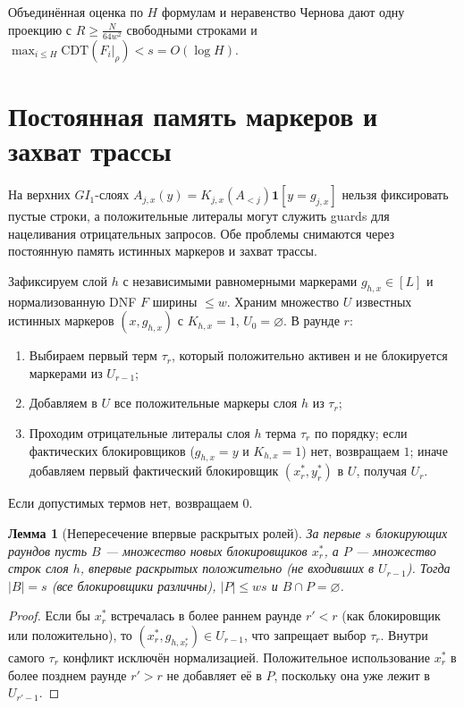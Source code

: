 \documentclass[11pt,a4paper]{article}
\newtheorem{lemma}[theorem]{Лемма}
\theoremstyle{definition}
\theoremstyle{remark}
\newcommand{\CDT}{\mathrm{CDT}}
\newcommand{\GI}{GI_1}
\begin{document}
Объединённая оценка по $H$ формулам и неравенство Чернова дают одну проекцию с $R \ge \frac{N}{64w^2}$ свободными строками и $\max_{i \le H} \CDT(F_i|_\rho) < s = O(\log H)$.

\section{Постоянная память маркеров и захват трассы}

На верхних $\GI$-слоях $A_{j,x}(y) = K_{j,x}(A_{<j})\mathbf{1}[y = g_{j,x}]$ нельзя фиксировать пустые строки, а положительные литералы могут служить guards для нацеливания отрицательных запросов. Обе проблемы снимаются через постоянную память истинных маркеров и захват трассы.

Зафиксируем слой $h$ с независимыми равномерными маркерами $g_{h,x} \in [L]$ и нормализованную DNF $F$ ширины $\le w$. Храним множество $U$ известных истинных маркеров $(x, g_{h,x})$ с $K_{h,x} = 1$, $U_0 = \varnothing$. В раунде $r$:
\begin{enumerate}
  \item Выбираем первый терм $\tau_r$, который положительно активен и не блокируется маркерами из $U_{r-1}$;
  \item Добавляем в $U$ все положительные маркеры слоя $h$ из $\tau_r$;
  \item Проходим отрицательные литералы слоя $h$ терма $\tau_r$ по порядку; если фактических блокировщиков ($g_{h,x}=y$ и $K_{h,x}=1$) нет, возвращаем $1$; иначе добавляем первый фактический блокировщик $(x_r^*, y_r^*)$ в $U$, получая $U_r$.
\end{enumerate}
Если допустимых термов нет, возвращаем $0$.

\begin{lemma}[Непересечение впервые раскрытых ролей]
\label{lem:role-disjoint-ru}
За первые $s$ блокирующих раундов пусть $B$ — множество новых блокировщиков $x_r^*$, а $P$ — множество строк слоя $h$, \emph{впервые} раскрытых положительно (не входивших в $U_{r-1}$). Тогда $|B| = s$ (все блокировщики различны), $|P| \le ws$ и $B \cap P = \varnothing$.
\end{lemma}

\begin{proof}
Если бы $x_r^*$ встречалась в более раннем раунде $r' < r$ (как блокировщик или положительно), то $(x_r^*, g_{h,x_r^*}) \in U_{r-1}$, что запрещает выбор $\tau_r$. Внутри самого $\tau_r$ конфликт исключён нормализацией. Положительное использование $x_r^*$ в более позднем раунде $r' > r$ не добавляет её в $P$, поскольку она уже лежит в $U_{r'-1}$.
\end{proof}
\end{document}
